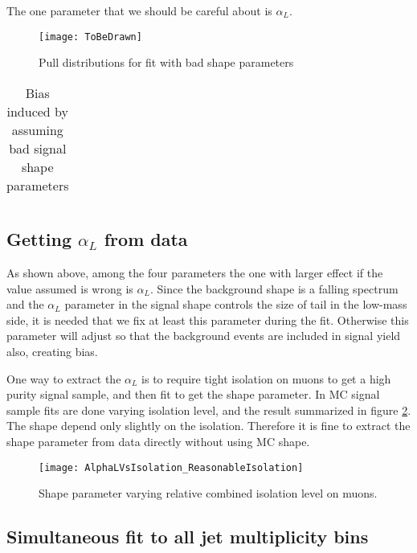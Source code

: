 \documentclass{cmspaper}
\begin{document}
The one parameter that we should be careful about is $\alpha_L$.

\begin{figure}
   \centering
   \texttt{[image: ToBeDrawn]}
   \caption{Pull distributions for fit with bad shape parameters}
   \label{Figure_BadShapePulls}
\end{figure}

\begin{table}[htdp]
 \caption{Bias induced by assuming bad signal shape parameters}
 \centering
 \begin{tabular}{|c|c|c|c|c|c|}
 \hline
 \end{tabular}
 \label{Table_BadShapeSummary}
\end{table}

\subsection{Getting $\alpha_L$ from data}

As shown above, among the four parameters the one with larger effect
if the value assumed is wrong is $\alpha_L$.  Since the background
shape is a falling spectrum and the $\alpha_L$ parameter in the signal
shape controls the size of tail in the low-mass side, it is needed
that we fix at least this parameter during the fit.  Otherwise this
parameter will adjust so that the background events are included in
signal yield also, creating bias.

One way to extract the $\alpha_L$ is to require tight isolation on
muons to get a high purity signal sample, and then fit to get the
shape parameter.  In MC signal sample fits are done varying isolation
level, and the result summarized in figure
\ref{Figure_AlphaLVsIsolation}.  The shape depend only slightly on the
isolation.  Therefore it is fine to extract the shape parameter from
data directly without using MC shape.

\begin{figure}
   \begin{center}
   \texttt{[image: AlphaLVsIsolation\_ReasonableIsolation]}
   \caption{Shape parameter varying relative combined isolation level on muons.}
   \label{Figure_AlphaLVsIsolation}
   \end{center}
\end{figure}

\subsection{Simultaneous fit to all jet multiplicity bins}
\label{sec:simfit}
\end{document}
